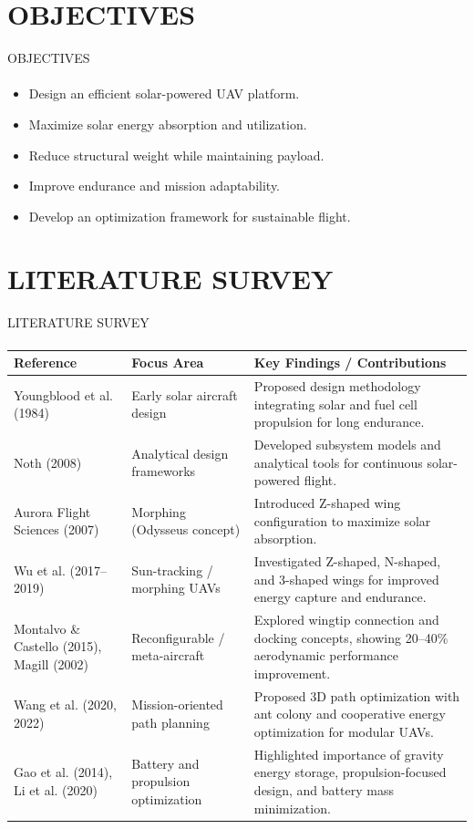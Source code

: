 \documentclass{beamer}
\begin{document}
\section{OBJECTIVES}
\begin{frame}{OBJECTIVES}
    \framesubtitle{
}
    \begin{itemize}
        \item Design an efficient solar-powered UAV platform.  
        \item Maximize solar energy absorption and utilization.  
        \item Reduce structural weight while maintaining payload.  
        \item Improve endurance and mission adaptability.  
        \item Develop an optimization framework for sustainable flight.  
    \end{itemize}
\end{frame}
\section{LITERATURE SURVEY}
\begin{frame}{LITERATURE SURVEY}
    \framesubtitle{}
    \begin{table}[]
        \centering
        \scriptsize %
        \begin{tabular}{|p{2.8cm}|p{2.8cm}|p{4.8cm}|}
            \hline
            \textbf{Reference} & \textbf{Focus Area} & \textbf{Key Findings / Contributions} \\ \hline
            Youngblood et al. (1984) & Early solar aircraft design & Proposed design methodology integrating solar and fuel cell propulsion for long endurance. \\ \hline
            Noth (2008) & Analytical design frameworks & Developed subsystem models and analytical tools for continuous solar-powered flight. \\ \hline
            Aurora Flight Sciences (2007) & Morphing (Odysseus concept) & Introduced Z-shaped wing configuration to maximize solar absorption. \\ \hline
            Wu et al. (2017–2019) & Sun-tracking / morphing UAVs & Investigated Z-shaped, N-shaped, and 3-shaped wings for improved energy capture and endurance. \\ \hline
            Montalvo \& Castello (2015), Magill (2002) & Reconfigurable / meta-aircraft & Explored wingtip connection and docking concepts, showing 20–40\% aerodynamic performance improvement. \\ \hline
            Wang et al. (2020, 2022) & Mission-oriented path planning & Proposed 3D path optimization with ant colony and cooperative energy optimization for modular UAVs. \\ \hline
            Gao et al. (2014), Li et al. (2020) & Battery and propulsion optimization & Highlighted importance of gravity energy storage, propulsion-focused design, and battery mass minimization. \\ \hline
        \end{tabular}
    \end{table}
\end{frame}
\end{document}
